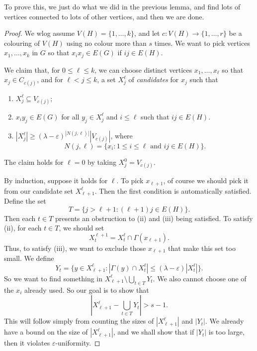 \documentclass[a4paper]{article}
\begin{document}
To prove this, we just do what we did in the previous lemma, and find lots of vertices connected to lots of other vertices, and then we are done.
\begin{proof}
  We wlog assume $V(H) = \{1, \ldots, k\}$, and let $c: V(H) \to \{1, \ldots, r\}$ be a colouring of $V(H)$ using no colour more than $s$ times. We want to pick vertices $x_1, \ldots, x_k$ in $G$ so that $x_i x_j \in E(G)$ if $ij \in E(H)$.

  We claim that, for $0 \leq \ell \leq k$, we can choose distinct vertices $x_1, \ldots, x_\ell$ so that $x_j \in C_{c(j)}$, and for $\ell < j \leq k$, a set $X^{\ell}_j$ of \emph{candidates} for $x_j$ such that
  \begin{enumerate}
    \item $X_j^{\ell} \subseteq V_{c(j)}$;
    \item $x_i y_j \in E(G)$ for all $y_j \in X_j^{\ell}$ and $i \leq \ell$ such that $ij \in E(H)$.
      
    \item $|X_j^{\ell}| \geq (\lambda - \varepsilon)^{|N(j, \ell)|} |V_{c(j)}|$, where
      \[
        N(j, \ell) = \{x_i: 1 \leq i \leq \ell \text{ and }ij \in E(H)\}.
      \]
  \end{enumerate}

  The claim holds for $\ell = 0$ by taking $X_j^0 = V_{c(j)}$.

  By induction, suppose it holds for $\ell$. To pick $x_{\ell + 1}$, of course we should pick it from our candidate set $X_{\ell + 1}^\ell$. Then the first condition is automatically satisfied. Define the set
  \[
    T = \{j > \ell + 1 : (\ell + 1)j \in E(H)\}.
  \]
  Then each $t \in T$ presents an obstruction to (ii) and (iii) being satisfied. To satisfy (ii), for each $t \in T$, we should set
  \[
    X^{\ell + 1}_t = X_t^\ell \cap \Gamma(x_{\ell + 1}).
  \]
  Thus, to satisfy (iii), we want to exclude those $x_{\ell + 1}$ that make this set too small. We define
  \[
    Y_t = \Big\{y \in X_{\ell + 1}^{\ell} : |\Gamma(y) \cap X_t^\ell| \leq (\lambda - \varepsilon) |X^{\ell}_t|\Big\}.
  \]
  So we want to find something in $X_{\ell + 1}^\ell \setminus \bigcup_{t \in T} Y_t$. We also cannot choose one of the $x_i$ already used. So our goal is to show that
  \[
    \left|X_{\ell + 1}^{\ell} - \bigcup_{t \in T} Y_t \right| > s - 1.
  \]
  This will follow simply from counting the sizes of $|X_{\ell + 1}^\ell|$ and $|Y_t|$. We already have a bound on the size of $|X_{\ell + 1}^\ell|$, and we shall show that if $|Y_t|$ is too large, then it violates $\varepsilon$-uniformity.


\end{proof}
\end{document}

